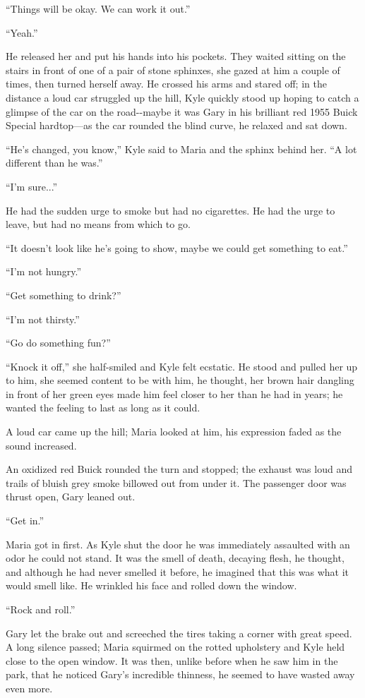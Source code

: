 ``Things will be okay. We can work it out.''

``Yeah.''

He released her and put his hands into his pockets. They waited sitting
on the stairs in front of one of a pair of stone sphinxes, she gazed at
him a couple of times, then turned herself away. He crossed his arms and
stared off; in the distance a loud car struggled up the hill, Kyle
quickly stood up hoping to catch a glimpse of the car on the
road-\/-maybe it was Gary in his brilliant red 1955 Buick Special
hardtop---as the car rounded the blind curve, he relaxed and sat down.

``He's changed, you know,'' Kyle said to Maria and the sphinx behind
her. ``A lot different than he was.''

``I'm sure...''

He had the sudden urge to smoke but had no cigarettes. He had the urge
to leave, but had no means from which to go.

``It doesn't look like he's going to show, maybe we could get something
to eat.''

``I'm not hungry.''

``Get something to drink?''

``I'm not thirsty.''

``Go do something fun?''

``Knock it off,'' she half-smiled and Kyle felt ecstatic. He stood and
pulled her up to him, she seemed content to be with him, he thought, her
brown hair dangling in front of her green eyes made him feel closer to
her than he had in years; he wanted the feeling to last as long as it
could.

A loud car came up the hill; Maria looked at him, his expression faded
as the sound increased.

An oxidized red Buick rounded the turn and stopped; the exhaust was loud
and trails of bluish grey smoke billowed out from under it. The
passenger door was thrust open, Gary leaned out.

``Get in.''

Maria got in first. As Kyle shut the door he was immediately assaulted
with an odor he could not stand. It was the smell of death, decaying
flesh, he thought, and although he had never smelled it before, he
imagined that this was what it would smell like. He wrinkled his face
and rolled down the window.

``Rock and roll.''

Gary let the brake out and screeched the tires taking a corner with
great speed. A long silence passed; Maria squirmed on the rotted
upholstery and Kyle held close to the open window. It was then, unlike
before when he saw him in the park, that he noticed Gary's incredible
thinness, he seemed to have wasted away even more.

